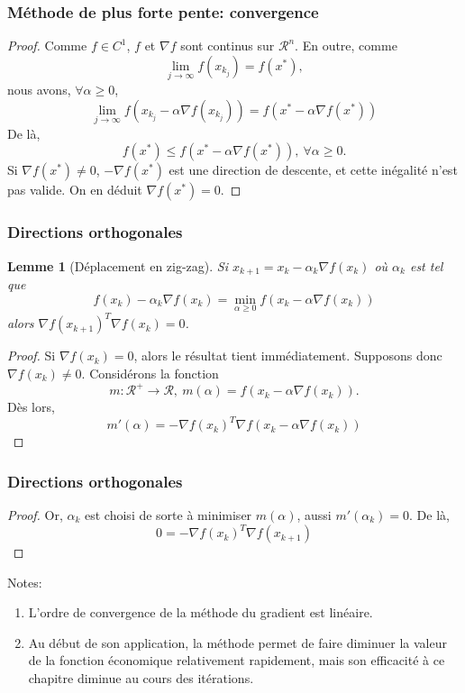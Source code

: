 \documentclass[usepdftitle=false]{beamer}
\newtheorem{lem}{Lemme}
\def\cR{\mathcal{R}}
\begin{document}
\begin{frame}
\frametitle{Méthode de plus forte pente: convergence}
	
\begin{proof}
Comme $f \in C^1$, $f$ et $\nabla f$ sont continus sur $\cR^n$.
En outre, comme
$$
\lim_{j \rightarrow \infty} f(x_{k_j}) = f(x^*),
$$
nous avons, $\forall \alpha \geq 0$,
$$
\lim_{j \rightarrow \infty} f(x_{k_j} - \alpha \nabla f(x_{k_j})) = f(x^* - \alpha \nabla f(x^*))
$$
De là,
$$
f(x^*) \leq  f(x^* - \alpha \nabla f(x^*)),\ \forall \alpha \geq 0.
$$
Si $\nabla f(x^*) \ne 0$, $-\nabla f(x^*)$ est une direction de descente, et cette inégalité n'est pas valide. On en déduit $\nabla f(x^*) = 0$.
\end{proof}

\end{frame}

\begin{frame}
\frametitle{Directions orthogonales}

\begin{lem}[Déplacement en zig-zag]
Si $x_{k + 1} = x_k - \alpha_k \nabla f ( x_k )$ où $\alpha_k$ est tel que
$$
f(x_k) - \alpha_k \nabla f(x_k) = \min_{\alpha \geq 0} f(x_k - \alpha \nabla f(x_k))
$$
alors $\nabla f(x_{k+1})^T\nabla f(x_k) = 0$.
\end{lem}

\begin{proof}
Si $\nabla f(x_k) = 0$, alors le résultat tient immédiatement.
Supposons donc $\nabla f(x_k) \ne 0$.
Considérons la fonction
$$
m: \cR^+ \rightarrow \cR,\ m(\alpha) = f(x_k - \alpha \nabla f(x_k)).
$$
Dès lors,
$$
m'(\alpha) = -\nabla f(x_k)^T \nabla f(x_k - \alpha \nabla f(x_k))
$$
\end{proof}

\end{frame}

\begin{frame}
\frametitle{Directions orthogonales}
	
\begin{proof}
Or, $\alpha_k$ est choisi de sorte à minimiser $m(\alpha)$, aussi $m'(\alpha_k) = 0$.
De là,
$$
0 = -\nabla f(x_k)^T \nabla f(x_{k+1})
$$
\end{proof}

Notes:
\begin{enumerate}
\item
L'ordre de convergence de la méthode du gradient est linéaire.
\item
Au début de son application, la méthode permet de faire
diminuer la valeur de la fonction économique relativement
rapidement, mais son efficacité à ce chapitre diminue au
cours des itérations.
\end{enumerate}

\end{frame}
\end{document}
